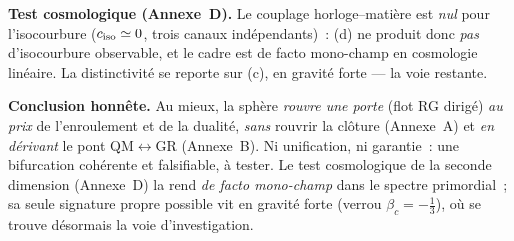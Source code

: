 \documentclass[11pt]{article}
\theoremstyle{definition}
\begin{document}
\textbf{Test cosmologique (Annexe~D).} Le couplage horloge--mati\`ere est \emph{nul} pour l'isocourbure
($c_{\rm iso}\simeq0$, trois canaux ind\'ependants)~: (d) ne produit donc \emph{pas} d'isocourbure
observable, et le cadre est de facto mono-champ en cosmologie lin\'eaire. La distinctivit\'e se reporte
sur (c), en gravit\'e forte --- la voie restante.

\textbf{Conclusion honn\^ete.} Au mieux, la sph\`ere \emph{rouvre une porte} (flot RG dirig\'e) \emph{au
prix} de l'enroulement et de la dualit\'e, \emph{sans} rouvrir la cl\^oture (Annexe~A) et \emph{en
d\'erivant} le pont QM$\leftrightarrow$GR (Annexe~B). Ni unification, ni garantie~: une bifurcation
coh\'erente et falsifiable, \`a tester. Le test cosmologique de la seconde dimension (Annexe~D) la rend
\emph{de facto mono-champ} dans le spectre primordial~; sa seule signature propre possible vit en
gravit\'e forte (verrou $\beta_c=-\tfrac13$), o\`u se trouve d\'esormais la voie d'investigation.
\end{document}
